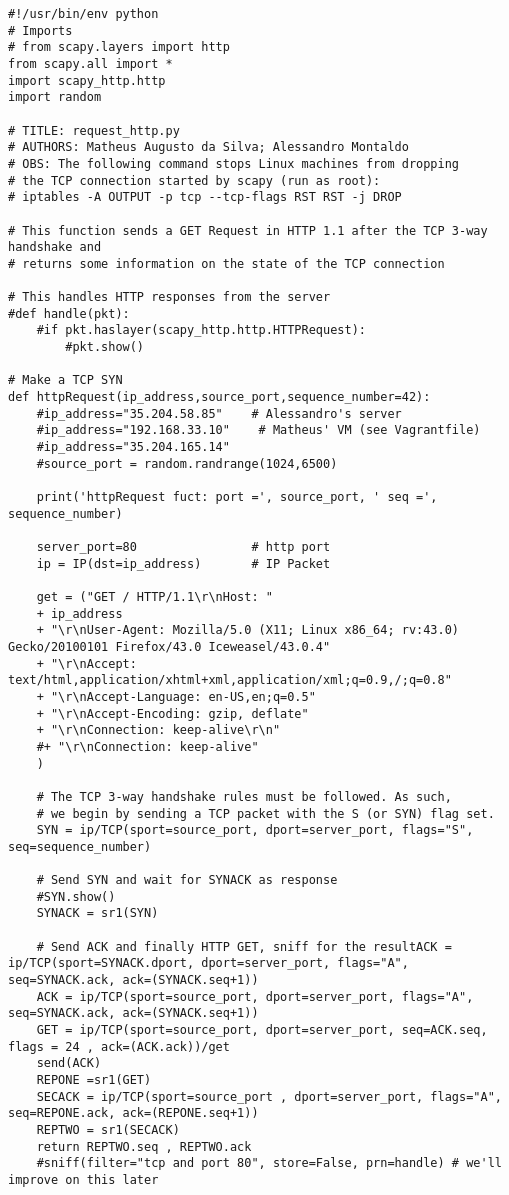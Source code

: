 \documentclass{article}
\begin{document}
\begin{lstlisting}
#!/usr/bin/env python
# Imports
# from scapy.layers import http
from scapy.all import *
import scapy_http.http
import random

# TITLE: request_http.py
# AUTHORS: Matheus Augusto da Silva; Alessandro Montaldo
# OBS: The following command stops Linux machines from dropping
# the TCP connection started by scapy (run as root):
# iptables -A OUTPUT -p tcp --tcp-flags RST RST -j DROP

# This function sends a GET Request in HTTP 1.1 after the TCP 3-way handshake and
# returns some information on the state of the TCP connection

# This handles HTTP responses from the server
#def handle(pkt):
    #if pkt.haslayer(scapy_http.http.HTTPRequest):
        #pkt.show()

# Make a TCP SYN
def httpRequest(ip_address,source_port,sequence_number=42): 
    #ip_address="35.204.58.85"    # Alessandro's server
    #ip_address="192.168.33.10"    # Matheus' VM (see Vagrantfile)
    #ip_address="35.204.165.14"
    #source_port = random.randrange(1024,6500)

    print('httpRequest fuct: port =', source_port, ' seq =', sequence_number)

    server_port=80                # http port
    ip = IP(dst=ip_address)       # IP Packet 

    get = ("GET / HTTP/1.1\r\nHost: "
    + ip_address
    + "\r\nUser-Agent: Mozilla/5.0 (X11; Linux x86_64; rv:43.0) Gecko/20100101 Firefox/43.0 Iceweasel/43.0.4"
    + "\r\nAccept: text/html,application/xhtml+xml,application/xml;q=0.9,/;q=0.8"
    + "\r\nAccept-Language: en-US,en;q=0.5"
    + "\r\nAccept-Encoding: gzip, deflate"
    + "\r\nConnection: keep-alive\r\n"
    #+ "\r\nConnection: keep-alive"
    )

    # The TCP 3-way handshake rules must be followed. As such,
    # we begin by sending a TCP packet with the S (or SYN) flag set.
    SYN = ip/TCP(sport=source_port, dport=server_port, flags="S", seq=sequence_number) 

    # Send SYN and wait for SYNACK as response
    #SYN.show()
    SYNACK = sr1(SYN)

    # Send ACK and finally HTTP GET, sniff for the resultACK = ip/TCP(sport=SYNACK.dport, dport=server_port, flags="A", seq=SYNACK.ack, ack=(SYNACK.seq+1))
    ACK = ip/TCP(sport=source_port, dport=server_port, flags="A", seq=SYNACK.ack, ack=(SYNACK.seq+1))
    GET = ip/TCP(sport=source_port, dport=server_port, seq=ACK.seq, flags = 24 , ack=(ACK.ack))/get
    send(ACK)
    REPONE =sr1(GET) 
    SECACK = ip/TCP(sport=source_port , dport=server_port, flags="A", seq=REPONE.ack, ack=(REPONE.seq+1))
    REPTWO = sr1(SECACK)
    return REPTWO.seq , REPTWO.ack
    #sniff(filter="tcp and port 80", store=False, prn=handle) # we'll improve on this later 
\end{lstlisting}
\end{document}
